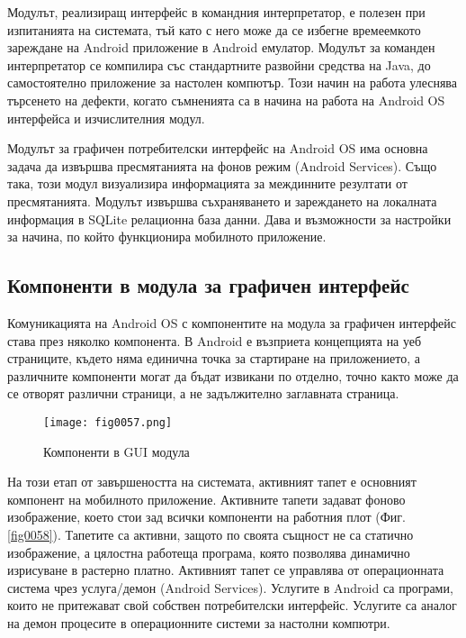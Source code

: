 Модулът, реализиращ интерфейс в командния интерпретатор, е полезен при изпитанията на системата, тъй като с него може да се избегне времеемкото зареждане на Android приложение в Android емулатор. Модулът за команден интерпретатор се компилира със стандартните развойни средства на Java, до самостоятелно приложение за настолен компютър. Този начин на работа улеснява търсенето на дефекти, когато съмненията са в начина на работа на Android OS интерфейса и изчислителния модул. 

Модулът за графичен потребителски интерфейс на Android OS има основна задача да извършва пресмятанията на фонов режим (Android Services). Също така, този модул визуализира информацията за междинните резултати от пресмятанията. Модулът извършва съхраняването и зареждането на локалната информация в SQLite релационна база данни. Дава и възможности за настройки за начина, по който функционира мобилното приложение. 

\subsection{Компоненти в модула за графичен интерфейс}

Комуникацията на Android OS с компонентите на модула за графичен интерфейс става през няколко компонента. В Android е възприета концепцията на уеб страниците, където няма единична точка за стартиране на приложението, а различните компоненти могат да бъдат извикани по отделно, точно както може да се отворят различни страници, а не задължително заглавната страница. 

\begin{figure}[H]
  \centering
  \texttt{[image: fig0057.png]}
  \caption{Компоненти в GUI модула}
\label{fig0057}
\end{figure}

На този етап от завършеността на системата, активният тапет е основният компонент на мобилното приложение. Активните тапети задават фоново изображение, което стои зад всички компоненти на работния плот (Фиг. \ref{fig0058}). Тапетите са активни, защото по своята същност не са статично изображение, а цялостна работеща програма, която позволява динамично изрисуване в растерно платно. Активният тапет се управлява от операционната система чрез услуга/демон (Android Services). Услугите в Android са програми, които не притежават свой собствен потребителски интерфейс. Услугите са аналог на демон процесите в операционните системи за настолни компютри. 

